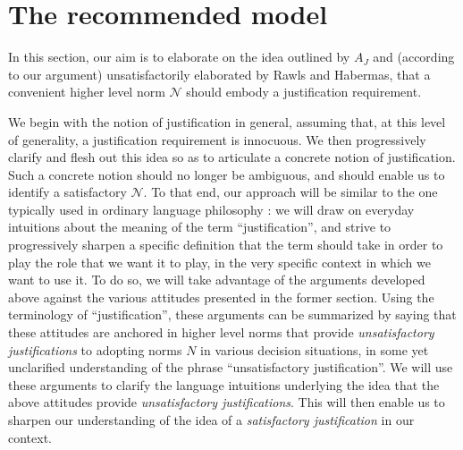 \documentclass[preprint, french, english, 11pt, authoryear]{elsarticle}%
\newcommand{\adv}{\mathscr{N}}
\begin{document}
\section{The recommended model}
\label{sec:recomm}


In this section, our aim is to elaborate on the idea outlined by $A_J$ and (according to our argument) unsatisfactorily elaborated by Rawls and Habermas, that a convenient higher level norm $\adv$ should embody a justification requirement.

We begin with the notion of justification in general, assuming that, at this level of generality, a justification requirement is innocuous. 
We then progressively clarify and flesh out this idea so as to articulate a concrete notion of justification. Such a concrete notion should no longer be ambiguous, and should enable us to identify a satisfactory $\adv$. 
To that end, our approach will be similar to the one typically used in ordinary language philosophy \citep{soames_philosophical_2003}: 
we will draw on everyday intuitions about the meaning of the term ``justification'', and strive to progressively sharpen a specific definition that the term should take in order to play the role that we want it to play, in the very specific context in which we want to use it. 
To do so, we will take advantage of the arguments developed above against the various attitudes presented in the former section. 
Using the terminology of ``justification'', these arguments can be summarized by saying that these attitudes are anchored in higher level norms that provide \emph{unsatisfactory justifications} to adopting norms $N$ in various decision situations, 
in some yet unclarified understanding of the phrase ``unsatisfactory justification''. We will use these arguments to clarify the language intuitions underlying the idea that the above attitudes provide \emph{unsatisfactory justifications}. 
This will then enable us to sharpen our understanding of the idea of a \emph{satisfactory justification} in our context.
\end{document}
